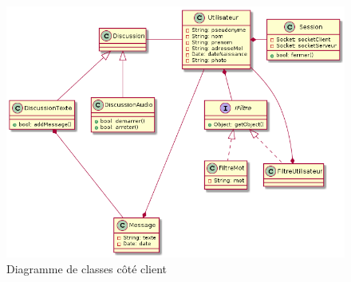 	\begin{figure}[H]
		\centerline{\includegraphics[width=16.5cm]{img/classesClient.png}}
		\caption{Diagramme de classes côté client}
	\end{figure}


